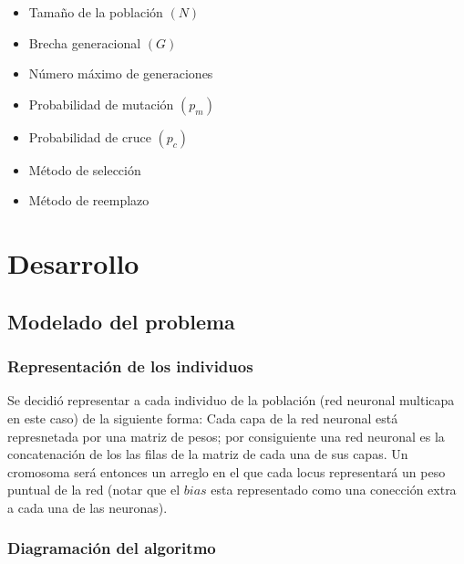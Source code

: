 \documentclass[%
    final,
    reprint,
    notitlepage,
    narroweqnarray,
    inline,
    twoside,
    invited
    ]{ieee}
\begin{document}
\begin{itemize} 
\item Tamaño de la población $(N)$
\item Brecha generacional $(G)$
\item Número máximo de generaciones
\item Probabilidad de mutación $(p_m)$
\item Probabilidad de cruce $(p_c)$
\item Método de selección
\item Método de reemplazo
\end{itemize} 



\section{Desarrollo}

\subsection{Modelado del problema}

\subsubsection{Representación de los individuos}

\par Se decidió representar a cada individuo de la población (red neuronal multicapa en este caso) de la siguiente forma: Cada capa de la red neuronal está represnetada por una matriz de pesos; por consiguiente una red neuronal es la concatenación de los las filas de la matriz de cada una de sus capas. Un cromosoma será entonces un arreglo en el que cada locus representará un peso puntual de la red (notar que el $bias$ esta representado como una conección extra a cada una de las neuronas).

\subsubsection{Diagramación del algoritmo}
\end{document}

